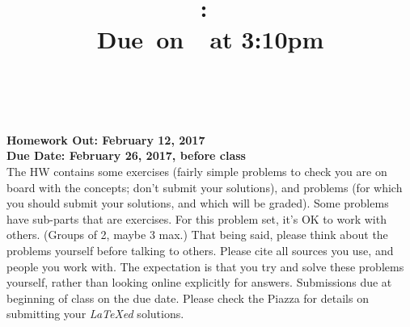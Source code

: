 \documentclass{article}
\title{
    \vspace{2in}
    \textmd{\textbf{\hmwkClass:\ \hmwkTitle}}\\
    \normalsize\vspace{0.1in}\small{Due\ on\ \hmwkDueDate\ at 3:10pm}\\
    \vspace{0.1in}\large{\textit{\hmwkClassInstructor\ \hmwkClassTime}}
    \vspace{3in}
}
\author{\hmwkAuthorName}
\date{}
\newcommand{\hmwkAssignedDate}{February 12, 2017}
\newcommand{\hmwkDueDate}{February 26, 2017, before class}
\begin{document}

\pagebreak

{\bf Homework Out: \hmwkAssignedDate}\\
{\bf Due Date:  \hmwkDueDate}\\

The HW contains some exercises (fairly simple problems to check you
are on board with the concepts; don’t submit your solutions), and
problems (for which you should submit your solutions, and which will
be graded). Some problems have sub-parts that are exercises.  For this
problem set, it’s OK to work with others. (Groups of 2, maybe 3 max.)
That being said, please think about the problems yourself before
talking to others. Please cite all sources you use, and people you
work with. The expectation is that you try and solve these problems
yourself, rather than looking online explicitly for
answers. Submissions due at beginning of class on the due date.
Please check the Piazza for details on submitting your \emph{LaTeXed}
solutions.
\end{document}
